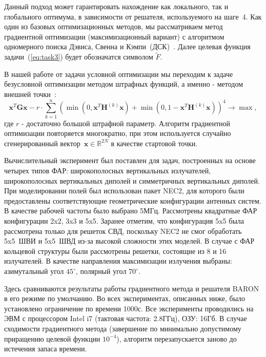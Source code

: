 Данный подход может гарантировать нахождение как локального, так и глобального оптимума, в зависимости от решателя, используемого на шаге~4. Как один из базовых оптимизационных методов, мы рассматриваем метод градиентной оптимизации (максимизационный вариант)
с алгоритмом одномерного поиска Дэвиса, Свенна и Кэмпи~(ДСК)~\cite{himmelblau:nlp}. Далее целевая функция задачи~(\ref{eq:task3}) будет обозначатся символом $\tilde{F}$.

В нашей работе от задачи условной оптимизации мы переходим к задаче безусловной оптимизации методом штрафных функций, а именно -
методом внешней точки~\cite{eremin:convex,aoki:mo}:
\begin{equation}
       \textbf{x}^{T}\textbf{Gx} - r\cdot \sum_{k=1}^n
       \left( \min\left(0,\textbf{x}^{T}\textbf{H}^{(k)}\textbf{x}\right) +
       \min\left(0,1-\textbf{x}^{T}\textbf{H}^{(k)}\textbf{x}\right)\right)^4 \rightarrow
       \max,
     \label{eq:task4}
\end{equation}
где $r$ - достаточно большой штрафной параметр. Алгоритм градиентной оптимизации повторяется многократно, при этом используется случайно сгенерированный вектор~$\textbf{x}\in \mathbb{R}^{2N}$ в качестве стартовой точки.

Вычислительный эксперимент был поставлен для задач, построенных на основе четырех типов ФАР: широкополосных вертикальных излучателей, широкополосных вертикальных диполей и симметричных вертикальных диполей. При моделировании полей был использован пакет NEC2, для которого были предоставлены соответствующие геометрические конфигурации антенных систем. В качестве рабочей частоты было выбрано 5МГц. Рассмотрены квадратные ФАР конфигурации 2x2, 3x3 и 5x5. Заранее отметим, что конфигурация 5x5 была рассмотрена только для решеток СВД, поскольку NEC2 не смог обработать 5x5~ШВИ и 5x5~ШВД из-за высокой сложности этих моделей. В случае с ФАР кольцевой структуры были рассмотрены решетки, состоящие из 8 и 16 излучателей. В качестве направления максимизации излучения выбраны: азимутальный угол $45^{\circ}$, полярный угол $70^{\circ}$.

Здесь сравниваются результаты работы градиентного метода и решателя BARON в его режиме по умолчанию. Во всех экспериментах, описанных ниже, было установлено ограничение по времени 1000с. Все эксперименты проводились на ЭВМ с процессором Intel i7 (тактовая частота: 2.8ГГц), ОЗУ: 16Гб. В случае сходимости градиентного метода (завершение по минимально допустимому приращению целевой функции $10^{-4}$), алгоритм перезапускается заново до истечения запаса времени.


